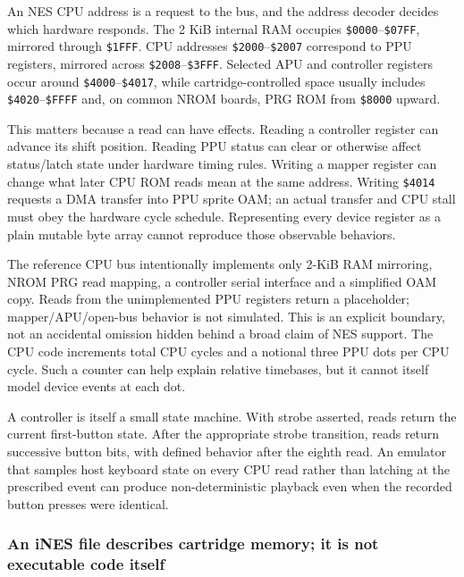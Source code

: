 An NES CPU address is a request to the bus, and the address decoder decides which hardware responds. The 2 KiB internal RAM occupies \texttt{\$0000}--\texttt{\$07FF}, mirrored through \texttt{\$1FFF}. CPU addresses \texttt{\$2000}--\texttt{\$2007} correspond to PPU registers, mirrored across \texttt{\$2008}--\texttt{\$3FFF}. Selected APU and controller registers occur around \texttt{\$4000}--\texttt{\$4017}, while cartridge-controlled space usually includes \texttt{\$4020}--\texttt{\$FFFF} and, on common NROM boards, PRG ROM from \texttt{\$8000} upward.

This matters because a read can have effects. Reading a controller register can advance its shift position. Reading PPU status can clear or otherwise affect status/latch state under hardware timing rules. Writing a mapper register can change what later CPU ROM reads mean at the same address. Writing \texttt{\$4014} requests a DMA transfer into PPU sprite OAM; an actual transfer and CPU stall must obey the hardware cycle schedule. Representing every device register as a plain mutable byte array cannot reproduce those observable behaviors.

The reference CPU bus intentionally implements only 2-KiB RAM mirroring, NROM PRG read mapping, a controller serial interface and a simplified OAM copy. Reads from the unimplemented PPU registers return a placeholder; mapper/APU/open-bus behavior is not simulated. This is an explicit boundary, not an accidental omission hidden behind a broad claim of NES support. The CPU code increments total CPU cycles and a notional three PPU dots per CPU cycle. Such a counter can help explain relative timebases, but it cannot itself model device events at each dot.

A controller is itself a small state machine. With strobe asserted, reads return the current first-button state. After the appropriate strobe transition, reads return successive button bits, with defined behavior after the eighth read. An emulator that samples host keyboard state on every CPU read rather than latching at the prescribed event can produce non-deterministic playback even when the recorded button presses were identical.

\subsubsection{An iNES file describes cartridge memory; it is not executable code itself}\label{06-engine-ii-ch042-an-ines-file-describes-cartridge-memory-it-is-not-executable-code-itself}

